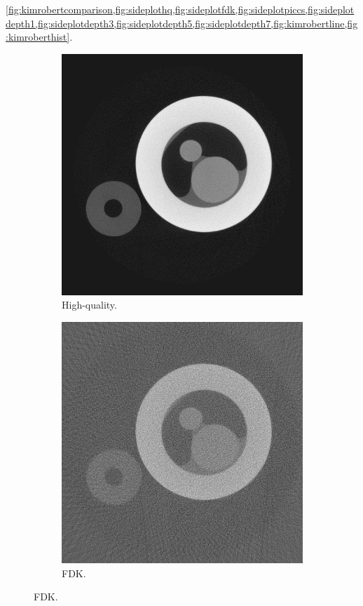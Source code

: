 \cref{fig:kimrobertcomparison,fig:sideplothq,fig:sideplotfdk,fig:sideplotpiccs,fig:sideplotdepth1,fig:sideplotdepth3,fig:sideplotdepth5,fig:sideplotdepth7,fig:kimrobertline,fig:kimroberthist}. 

\begin{figure}
    \begin{subfigure}[t]{.45\textwidth}
      \centering
      \includegraphics[width=\linewidth]{figures/kimrobertgt.png}
      \caption{High-quality. }
    \end{subfigure}
    \hfill
    \begin{subfigure}[t]{.45\textwidth}
      \centering
      \includegraphics[width=\linewidth]{figures/kimrobertFDK.png}
      \caption{FDK.}
    \end{subfigure}
  

\end{figure}

